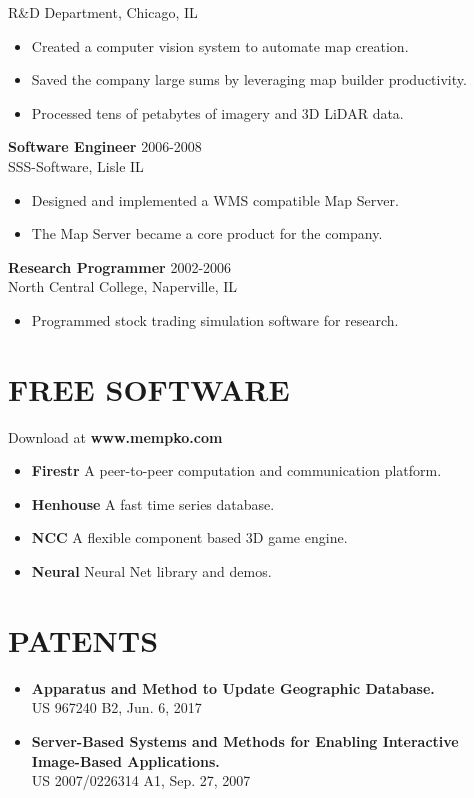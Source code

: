 \documentclass[line,margin]{res}
\begin{document}
\begin{resume}
                R\&D Department, Chicago, IL
                 \begin{itemize}  \itemsep -2pt %
                    \item Created a computer vision system to automate map creation.
                    \item Saved the company large sums by leveraging map builder productivity.
                    \item Processed tens of petabytes of imagery and 3D LiDAR data.
                \end{itemize}
                {\bf Software Engineer} \hfill  2006-2008 \\
                SSS-Software, Lisle IL
                 \begin{itemize}  \itemsep -2pt 
                    \item Designed and implemented a WMS compatible Map Server.
                    \item The Map Server became a core product for the company.
                 \end{itemize} 
                {\bf Research Programmer} \hfill 2002-2006 \\
                North Central College, Naperville, IL
                \begin{itemize} \itemsep -2pt 
                    \item Programmed stock trading simulation software for research.
                \end{itemize} 
\section{FREE SOFTWARE} Download at {\bf www.mempko.com} \\ 
                \begin{itemize} \itemsep -2pt 
                    \item {\bf Firestr} A peer-to-peer computation and communication platform.
                    \item {\bf Henhouse} A fast time series database.
                    \item {\bf NCC} A flexible component based 3D game engine.
                    \item {\bf Neural} Neural Net library and demos.
                \end{itemize}
\section{PATENTS} 
            \begin{itemize} \itemsep -2pt 
                    \item {\bf Apparatus and Method to Update Geographic Database.} \\ US 967240 B2, Jun. 6, 2017
                    \item {\bf Server-Based Systems and Methods for Enabling Interactive Image-Based Applications.} \\ US 2007/0226314 A1, Sep. 27, 2007
            \end{itemize}

\end{resume}
\end{document}
